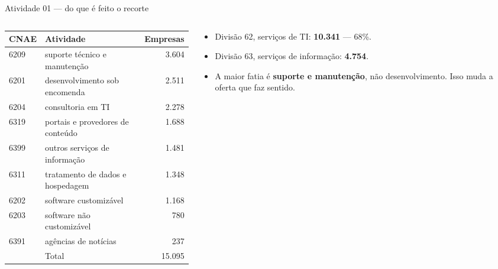 \documentclass[aspectratio=169]{beamer}
\newcommand{\recorte}{15.095}
\begin{document}
\begin{frame}{Atividade 01 --- do que é feito o recorte}
    \begin{columns}[T]
        \begin{column}{0.60\textwidth}
            \begin{table}
                \footnotesize
                \begin{tabular}{llr}
                    \toprule
                    CNAE & Atividade & Empresas \\
                    \midrule
                    6209 & suporte técnico e manutenção & 3.604 \\
                    6201 & desenvolvimento sob encomenda & 2.511 \\
                    6204 & consultoria em TI & 2.278 \\
                    6319 & portais e provedores de conteúdo & 1.688 \\
                    6399 & outros serviços de informação & 1.481 \\
                    6311 & tratamento de dados e hospedagem & 1.348 \\
                    6202 & software customizável & 1.168 \\
                    6203 & software não customizável & 780 \\
                    6391 & agências de notícias & 237 \\
                    \midrule
                    & Total & \recorte \\
                    \bottomrule
                \end{tabular}
            \end{table}
        \end{column}
        \begin{column}{0.36\textwidth}
            \begin{itemize}
                \item Divisão 62, serviços de TI: \textbf{10.341} --- 68\%.
                \item Divisão 63, serviços de informação: \textbf{4.754}.
                \item A maior fatia é \textbf{suporte e manutenção}, não
                      desenvolvimento. Isso muda a oferta que faz sentido.
            \end{itemize}
        \end{column}
    \end{columns}
\end{frame}
\end{document}
